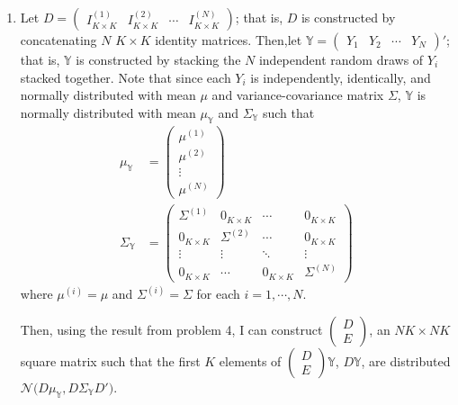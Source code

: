 \documentclass{article}[12pt]
\begin{document}
\begin{enumerate}
	\item Let $D = \begin{pmatrix} I_{K \times K} ^{(1)} & I_{K \times K} ^{(2)} & \cdots & I_{K \times K} ^{(N)}  \end{pmatrix}$; that is, $D$ is constructed by concatenating $N$ $K \times K$ identity matrices. Then,let $\mathbb{Y} = \begin{pmatrix} Y_1 & Y_2 & \cdots & Y_N \end{pmatrix}'$; that is, $\mathbb{Y}$ is constructed by stacking the $N$ independent random draws of $Y_i$ stacked together. Note that since each $Y_i$ is independently, identically, and normally distributed with mean $\mu$ and variance-covariance matrix $\Sigma$, $\mathbb{Y}$ is normally distributed with mean $\mu_{\mathbb{Y}}$ and $\Sigma_{\mathbb{Y}}$ such that 
	\begin{align*}
		\mu_{\mathbb{Y}} &=	\begin{pmatrix} \mu^{(1)} \\ \mu^{(2)} \\ \vdots \\ \mu^{(N)} \end{pmatrix} \\
		\Sigma_{\mathbb{Y}} &=
			\begin{pmatrix}
				\Sigma^{(1)} & 0_{K \times K} & \cdots & 0_{K \times K} \\
				0_{K \times K} & \Sigma^{(2)} & \cdots & 0_{K \times K} \\
				\vdots & \vdots & \ddots & \vdots \\
				0_{K \times K} & \cdots & 0_{K \times K} & \Sigma^{(N)}
			\end{pmatrix}
	\end{align*}
	where $\mu^{(i)} = \mu$ and $\Sigma^{(i)} = \Sigma$ for each $i = 1, \cdots, N$.

	Then, using the result from problem 4, I can construct $\begin{pmatrix} D \\ E \end{pmatrix}$, an $NK \times NK$ square matrix such that the first $K$ elements of $\begin{pmatrix} D \\ E \end{pmatrix} \mathbb{Y}$, $D\mathbb{Y}$, are distributed $\mathscr{N} \bigg( D \mu_{\mathbb{Y}}, D \Sigma_{\mathbb{Y}} D' \bigg)$.


\end{enumerate}
\end{document}
